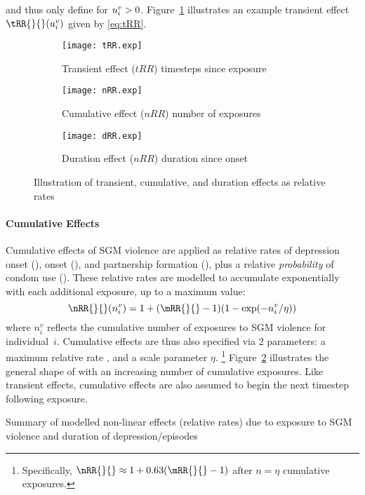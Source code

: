 and thus only define \tRR{}{} for $u^v_i > 0$.
Figure~\ref{fig:tRR} illustrates
an example transient effect $\tRR{}{}(\du^v_i)$ given by \eqref{eq:tRR}.
\begin{figure}
  \centering
  \begin{subfigure}{.5\linewidth}
    \texttt{[image: tRR.exp]}
    \caption{Transient effect ($tRR$) \vs timesteps since exposure}
    \label{fig:tRR}
  \end{subfigure}%
  \begin{subfigure}{.5\linewidth}
    \texttt{[image: nRR.exp]}
    \caption{Cumulative effect ($nRR$) \vs number of exposures}
    \label{fig:nRR}
  \end{subfigure}
  \begin{subfigure}{.5\linewidth}
    \texttt{[image: dRR.exp]}
    \caption{Duration effect ($nRR$) \vs duration since onset}
    \label{fig:dRR}
  \end{subfigure}
  \caption{Illustration of transient, cumulative, and duration effects as relative rates}
  \label{fig:xRR}
\end{figure}
\paragraph{Cumulative Effects}
Cumulative effects of SGM violence are applied as relative rates of
depression onset (),
\hazdrink onset (), and
partnership formation (), plus
a relative \emph{probability} of condom use ().
These relative rates are modelled to accumulate exponentially
with each additional exposure, up to a maximum value:
\begin{equation}\label{eq:nRR}
  \nRR{}{}(n^v_i) = 1+(\mRR{}{}-1)(1-\exp(-n^v_i/\eta))
\end{equation}
where $n^v_i$ reflects the cumulative number of
exposures to SGM violence for individual~$i$.
Cumulative effects are thus also specified via 2 parameters:
a maximum relative rate \mRR{}{}, and a scale parameter $\eta$.%
\footnote{Specifically, $\nRR{}{} \approx 1 + 0.63 (\mRR{}{}-1)$
  after $n = \eta$ cumulative exposures.}
Figure~\ref{fig:nRR} illustrates the general shape of \nRR{}{}
with an increasing number of cumulative exposures.
Like transient effects, cumulative effects are also assumed
to begin the next timestep following exposure.
\begin{table}
  \caption{Summary of modelled non-linear effects (relative rates) due to
    exposure to SGM violence and
    duration of depression/\hazdrink episodes}
  \label{tab:xrr}
  \centering
\end{table}
